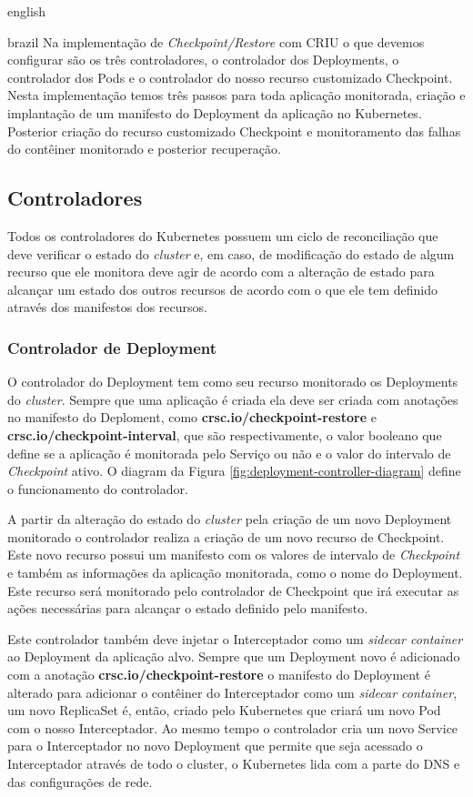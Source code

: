 \begin{otherlanguage*}{english}
\begin{otherlanguage*}{brazil}
Na implementação de \textit{Checkpoint/Restore} com CRIU o que devemos configurar são
os três controladores, o controlador dos Deployments, o controlador dos Pods e o
controlador do nosso recurso customizado Checkpoint. Nesta implementação temos três
passos para toda aplicação monitorada, criação e implantação de um manifesto do
Deployment da aplicação no Kubernetes. Posterior criação do recurso customizado
Checkpoint e monitoramento das falhas do contêiner monitorado e posterior recuperação.

\subsection{Controladores}

Todos os controladores do Kubernetes possuem um ciclo de reconciliação que deve
verificar o estado do \textit{cluster} e, em caso, de modificação do estado de algum
recurso que ele monitora deve agir de acordo com a alteração de estado para alcançar
um estado dos outros recursos de acordo com o que ele tem definido através dos manifestos
dos recursos.

\subsubsection{Controlador de Deployment}

O controlador do Deployment tem como seu recurso monitorado os Deployments do
\textit{cluster}. Sempre que uma aplicação é criada ela deve ser criada com anotações
no manifesto do Deploment, como \textbf{crsc.io/checkpoint-restore} e
\textbf{crsc.io/checkpoint-interval}, que são respectivamente, o valor booleano que
define se a aplicação é monitorada pelo Serviço ou não e o valor do intervalo de
\textit{Checkpoint} ativo. O diagram da Figura \ref{fig:deployment-controller-diagram}
define o funcionamento do controlador.


A partir da alteração do estado do \textit{cluster} pela criação de um novo Deployment
monitorado o controlador realiza a criação de um novo recurso de Checkpoint. Este novo
recurso possui um manifesto com os valores de intervalo de \textit{Checkpoint} e também
as informações da aplicação monitorada, como o nome do Deployment. Este recurso será 
monitorado pelo controlador de Checkpoint que irá executar as ações necessárias para
alcançar o estado definido pelo manifesto.

Este controlador também deve injetar o Interceptador como um \textit{sidecar container}
ao Deployment da aplicação alvo. Sempre que um Deployment novo é adicionado com a 
anotação \textbf{crsc.io/checkpoint-restore} o manifesto do Deployment é alterado
para adicionar o contêiner do Interceptador como um \textit{sidecar container}, um novo
ReplicaSet é, então, criado pelo Kubernetes que criará um novo Pod com o nosso
Interceptador. Ao mesmo tempo o controlador cria um novo Service para o Interceptador no
novo Deployment que permite que seja acessado o Interceptador através de todo o cluster,
o Kubernetes lida com a parte do DNS e das configurações de rede.


\end{otherlanguage*}
\end{otherlanguage*}
